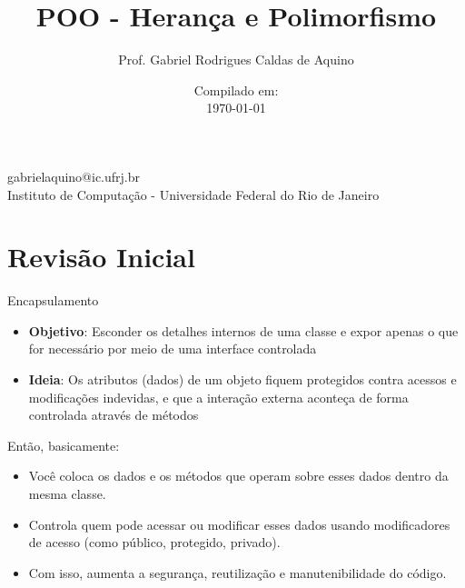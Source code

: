 \title{POO - Herança e Polimorfismo}

\author{Prof. Gabriel Rodrigues Caldas de Aquino}

\institute
{
    gabrielaquino@ic.ufrj.br\\

    Instituto de Computação -
    Universidade Federal do Rio de Janeiro %
}
\date{Compilado em: \\ \today} %


\section{Revisão Inicial}

\begin{frame}
    \titlepage
\end{frame}


\begin{frame}{Encapsulamento}

    \begin{itemize}
        \item \textbf{Objetivo}: Esconder os detalhes internos de uma classe e expor apenas o que for necessário por meio de uma interface controlada

        \item \textbf{Ideia}: Os atributos (dados) de um objeto fiquem protegidos contra acessos e modificações indevidas, e que a interação externa aconteça de forma controlada através de métodos
    \end{itemize}



    \begin{block}{Então, basicamente:}
        \begin{itemize}
            \item Você coloca os dados e os métodos que operam sobre esses dados dentro da mesma classe.

            \item Controla quem pode acessar ou modificar esses dados usando modificadores de acesso (como público, protegido, privado).

            \item Com isso, aumenta a segurança, reutilização e manutenibilidade do código.
        \end{itemize}
    \end{block}

\end{frame}





